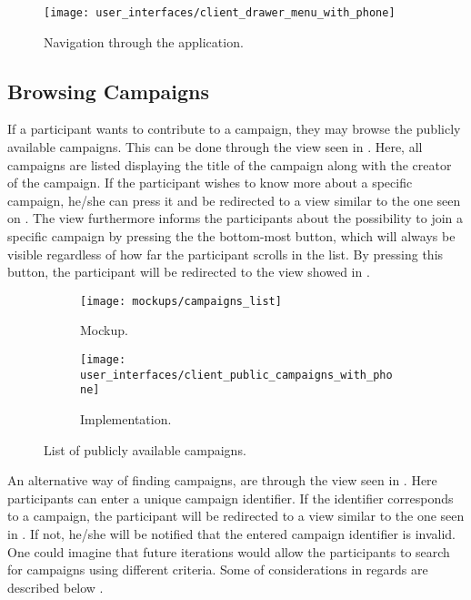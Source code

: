 \begin{figure}[!htbp]
\centering
\texttt{[image: user\_interfaces/client\_drawer\_menu\_with\_phone]}
\caption{Navigation through the application.}
\label{fig:navigation}
\end{figure}
\FloatBarrier

\subsection{Browsing Campaigns}
If a participant wants to contribute to a campaign, they may browse the publicly available campaigns. This can be done through the view seen in . Here, all campaigns are listed displaying the title of the campaign along with the creator of the campaign. If the participant wishes to know more about a specific campaign, he/she can press it and be redirected to a view similar to the one seen on . The view furthermore informs the participants about the possibility to join a specific campaign by pressing the the bottom-most button, which will always be visible regardless of how far the participant scrolls in the list. By pressing this button, the participant will be redirected to the view showed in .

\begin{figure}[!htbp]
\begin{subfigure}[!t]{.48\textwidth}
  \centering
  \texttt{[image: mockups/campaigns\_list]}
  \caption{Mockup.}
  \label{fig:mockup_public_campaigns}
\end{subfigure}%
\begin{subfigure}[!t]{.52\textwidth}
  \centering
  \texttt{[image: user\_interfaces/client\_public\_campaigns\_with\_phone]}
  \caption{Implementation.}
  \label{fig:implementation_public_campaigns}
\end{subfigure}
\caption{List of publicly available campaigns.}
\label{fig:public_campaigns}
\end{figure}
\FloatBarrier

An alternative way of finding campaigns, are through the view seen in . Here participants can enter a unique campaign identifier. If the identifier corresponds to a campaign, the participant will be redirected to a view similar to the one seen in . If not, he/she will be notified that the entered campaign identifier is invalid. One could imagine that future iterations would allow the participants to search for campaigns using different criteria. Some of considerations in regards are described below .

